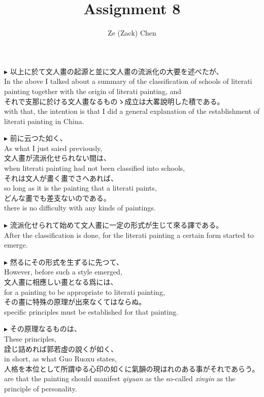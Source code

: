 \documentclass{ctexart}
\title{Assignment 8}
\author{Ze (Zack) Chen}
\makeatletter
\newcommand*{\shifttext}[1]{%
  \settowidth{\@tempdima}{#1}%
  \hspace{-\@tempdima}#1%
}
\newcommand{\plabel}[1]{%
\shifttext{\textbf{#1}\quad}%
}
\makeatother
\begin{document}
\maketitle

\plabel{$\blacktriangleright$}%
以上に於て文人畫の起源と並に文人畫の流派化の大要を述べたが、\\
In the above I talked about a summary of the classification of schools of literati painting together with the origin of literati painting, and\\
それで支那に於ける文人畫なるものゝ成立は大畧說明した積である。\\
with that, the intention is that I did a general explanation of the establishment of literati painting in China.

\vspace{1em}
\plabel{$\blacktriangleright$}%
前に云つた如く、\\
As what I just saied previously,\\
文人畫が流派化せられない間は、\\
when literati painting had not been classified into schools,\\
それは文人が畫く畫でさへあれば、\\
so long as it is the painting that a literati paints,\\
どんな畫でも差支ないのである。\\
there is no difficulty with any kinds of paintings.

\vspace{1em}
\plabel{$\blacktriangleright$}%
流派化せられて始めて文人畫に一定の形式が生じて來る譯である。\\
After the classification is done, for the literati painting a certain form started to emerge.

\vspace{1em}
\plabel{$\blacktriangleright$}%
然るにその形式を生ずるに先つて、\\
However, before such a style emerged,\\
文人畫に相應しい畫となる爲には、\\
for a painting to be appropriate to literati painting,\\
その畫に特殊の原理が出來なくてはならぬ。\\
specific principles must be established for that painting.

\vspace{1em}
\plabel{$\blacktriangleright$}%
その原理なるものは、\\
These principles,\\
詮じ詰めれば郭若虛の說くが如く、\\
in short, as what Guo Ruoxu states,\\
人格を本位として所謂ゆる心印の如くに氣韻の現はれのある事がそれであらう。\\
are that the painting should manifest \textit{qiyuan} as the so-called \textit{xinyin} as the principle of personality.
\end{document}
